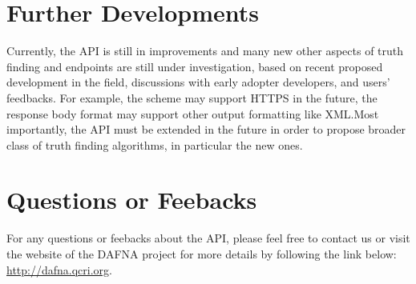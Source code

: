 \documentclass[a4paper,10pt]{scrartcl}
\begin{document}
\section{Further Developments}
Currently, the API is still in improvements and many new other aspects of truth finding and endpoints are still under investigation, based on recent
proposed development in the field, discussions with early adopter developers, and users' feedbacks. For example, the scheme may support HTTPS in the 
future, the response body format may support other output formatting like XML.Most importantly, the API must be extended in the future in order to propose
broader class of truth finding algorithms, in particular the new ones.

\section{Questions or Feebacks}
For any questions or feebacks about the API, please feel free to contact us %
or visit the website of the DAFNA project for more details by following the link below:
\href{http://dafna.qcri.org}{\small{http://dafna.qcri.org}}.
\end{document}
